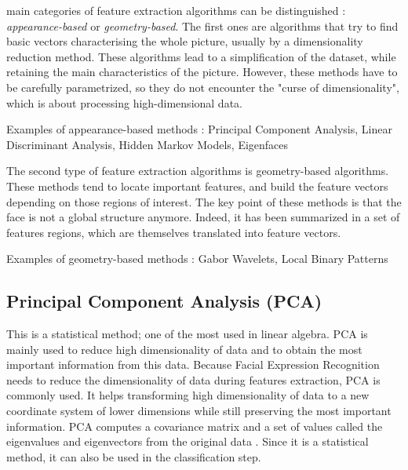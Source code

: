  main categories of feature extraction algorithms can be distinguished : \textit{appearance-based} or \textit{geometry-based}. The first ones are algorithms that try to find basic vectors characterising the whole picture, usually by a dimensionality reduction method. These algorithms lead to a simplification of the dataset, while retaining the main characteristics of the picture. However, these methods have to be carefully parametrized, so they do not encounter the "curse of dimensionality", which is about processing high-dimensional data.
\vspace{\baselineskip}

\noindent Examples of appearance-based methods : Principal Component Analysis, Linear Discriminant Analysis, Hidden Markov Models, Eigenfaces
\newline

\noindent The second type of feature extraction algorithms is geometry-based algorithms. These methods tend to locate important features, and build the feature vectors depending on those regions of interest. The key point of these methods is that the face is not a global structure anymore. Indeed, it has been summarized in a set of features regions, which are themselves translated into feature vectors.
\vspace{\baselineskip}

\noindent Examples of geometry-based methods : Gabor Wavelets, Local Binary Patterns
\newline

\subsection{Principal Component Analysis (PCA)}

\vspace{\baselineskip}
\noindent This is a statistical method; one of the most used in linear algebra. PCA is mainly used to reduce high dimensionality of data and to obtain the most important information from this data. Because Facial Expression Recognition needs to reduce the dimensionality of data during features extraction, PCA is commonly used. It helps transforming high dimensionality of data to a new coordinate system of lower dimensions while still preserving the most important information. PCA computes a covariance matrix and a set of values called the eigenvalues and eigenvectors from the original data \cite{GAN08}. Since it is a statistical method, it can also be used in the classification step.
\newline

